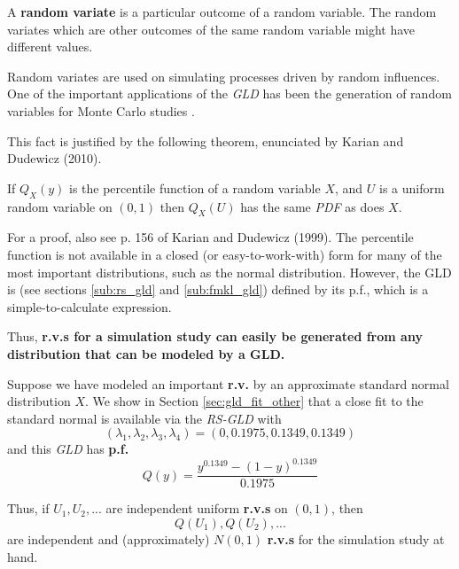 \begin{defn} 
A \textbf{random variate} is a particular outcome of a random variable. The random variates which are other outcomes of the same random variable might have different values.
\end{defn}

Random variates are used on simulating processes driven by random influences. One of the important applications of the \textit{GLD} has been the generation of random variables for Monte Carlo studies \cite{Mustafa2016}.

This fact is justified by the following theorem, enunciated by Karian and Dudewicz (2010).

\begin{thm}
If $Q_{X}(y)$ is the percentile function of a random variable $X$, and $U$ is a uniform random variable
on $(0, 1)$ then $Q_{X}(U)$ has the same \textit{PDF} as does $X$.
\end{thm}

For a proof, also see p. 156 of Karian and Dudewicz (1999). The percentile function is not available in a closed (or easy-to-work-with) form for many of the most important distributions, such as the normal distribution. However, the GLD is (see sections \ref{sub:rs_gld} and \ref{sub:fmkl_gld}) defined by its p.f., which is a simple-to-calculate expression.

Thus, \textbf{r.v.s for a simulation study can easily be generated from any distribution that can be modeled by a GLD.}

\begin{exmp}
Suppose we have modeled an important \textbf{r.v.} by an approximate standard normal distribution $X$. We show in Section \ref{sec:gld_fit_other} that a close fit to the standard normal is available via the \textit{RS-GLD} with 
\begin{equation}
(\lambda_{1}, \lambda_{2}, \lambda_{3}, \lambda_{4}) = (0, 0.1975, 0.1349, 0.1349)
\end{equation}
and this \textit{GLD} has \textbf{p.f.} 
\begin{equation}
Q(y) = \frac{y^{0.1349}-(1-y)^{0.1349}}{0.1975}
\end{equation}
\end{exmp}

Thus, if $U_{1}, U_{2},...$ are independent uniform \textbf{r.v.s} on $(0, 1)$, then 
\begin{equation}\label{eq:random_variate}
Q(U_{1}), Q(U_{2}),...
\end{equation}
are independent and (approximately) $N(0, 1)$ \textbf{r.v.s} for the simulation study at hand.

